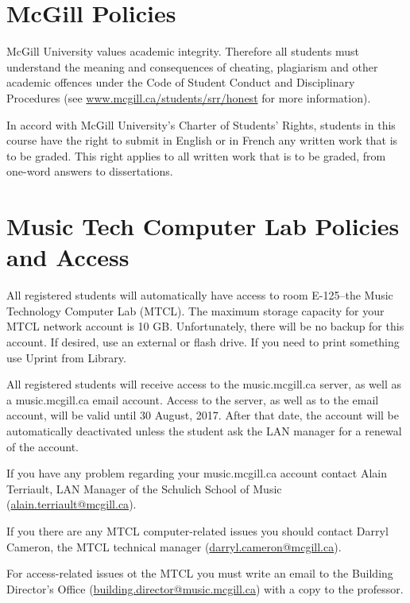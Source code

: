 \documentclass[11pt]{amsart}
\begin{document}
\section{McGill Policies}

McGill University values academic integrity. Therefore all students must understand the meaning and consequences of cheating, plagiarism and other academic offences under the Code of Student Conduct and Disciplinary Procedures (see \href{http://www.mcgill.ca/students/srr/honest}{www.mcgill.ca/students/srr/honest} for more information).

In accord with McGill University’s Charter of Students’ Rights, students in this course have the right to submit in English or in French any written work that is to be graded. This right applies to all written work that is to be graded, from one-word answers to dissertations.


\section{Music Tech Computer Lab Policies and Access}
All registered students will automatically have access to room E-125--the Music Technology Computer Lab (MTCL).
The maximum storage capacity for your MTCL network account is 10 GB.\@
Unfortunately, there will be no backup for this account. If desired, use an external or flash drive. If you need to print something use Uprint from Library. 

All registered students will receive access to the music.mcgill.ca server, as well as a music.mcgill.ca email account. Access to the server, as well as to the email account, will be valid until 30 August, 2017. After that date, the account will be automatically deactivated unless the student ask the LAN manager for a renewal of the account.

If you have any problem regarding your music.mcgill.ca account contact Alain Terriault, LAN Manager of the Schulich School of Music (\href{mailto:alain.terriault@mcgill.ca}{alain.terriault@mcgill.ca}). 

If you there are any MTCL computer-related issues you should contact Darryl Cameron, the MTCL technical manager (\href{mailto:darryl.cameron@mcgill.ca}{darryl.cameron@mcgill.ca}). 

For access-related issues ot the MTCL you must write an email to the Building Director's Office (\href{mailto:building.director@music.mcgill.ca}{building.director@music.mcgill.ca}) with a copy to the professor. 
\end{document}
